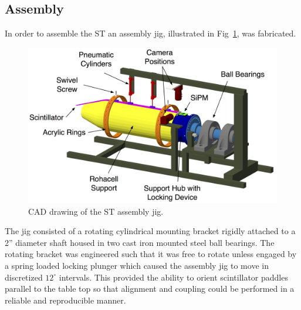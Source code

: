 
\subsection{Assembly} \label{sec:fab_ass}

In order to assemble the ST an assembly jig, illustrated in Fig~\ref{fig:ajcaddrawing}, was fabricated.  
	\begin{figure}[!htb]
		\centering
		\includegraphics[width=1.0\columnwidth]{fabrication/figs/assembly_jig_v2}
		\caption{CAD drawing of the ST assembly jig.}
		\label{fig:ajcaddrawing}
	\end{figure}
The jig consisted of a rotating cylindrical mounting bracket rigidly attached to a 2'' diameter shaft housed in two cast iron mounted steel ball bearings.  The rotating bracket was engineered such that it was free to rotate unless engaged by a spring loaded locking plunger which caused the assembly jig to move in discretized $12^{\circ}$ intervals.  This provided the ability to orient scintillator paddles parallel to the table top so that alignment and coupling could be performed in a reliable and reproducible manner.


